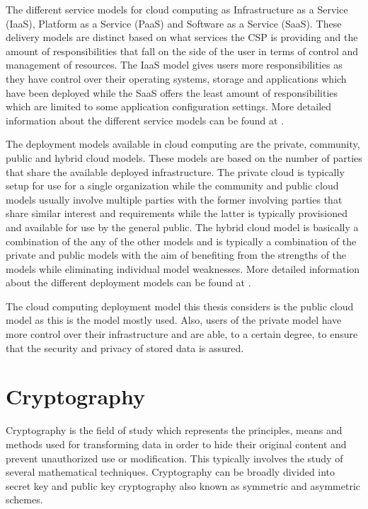 The different service models for cloud computing as Infrastructure as a Service (IaaS), Platform as a Service (PaaS) and Software as a Service (SaaS). These delivery models are distinct based on what services the CSP is providing and the amount of responsibilities that fall on the side of the user in terms of control and management of resources. The IaaS model gives users more responsibilities as they have control over their operating systems, storage and applications which have been deployed while the SaaS offers the least amount of responsibilities which are limited to some application configuration settings. More detailed information about the different service models can be found at \cite{nist}.

The deployment models available in cloud computing are the private, community, public and hybrid cloud models. These models are based on the number of parties that share the available deployed infrastructure. The private cloud is typically setup for use for a single organization while the community and public cloud models usually involve multiple parties with the former involving parties that share similar interest and requirements while the latter is typically provisioned and available for use by the general public. The hybrid cloud model is basically a combination of the any of the other models and is typically a combination of the private and public models with the aim of benefiting from the strengths of the models while eliminating individual model weaknesses. More detailed information about the different deployment models can be found at \cite{nist}.

The cloud computing deployment model this thesis considers is the public cloud model as this is the model mostly used. Also, users of the private model have more control over their infrastructure and are able, to a certain degree, to ensure that the security and privacy of stored data is assured.

\section{Cryptography}

Cryptography\cite{Kissel2013} is the field of study which represents the principles, means and methods used for transforming data in order to hide their original content and prevent unauthorized use or modification. This typically involves the study of several mathematical techniques. Cryptography can be broadly divided into secret key and public key cryptography also known as symmetric and asymmetric schemes.


